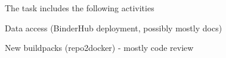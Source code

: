 \begin{task}[
  title=Support more use patterns,
  id=patterns,
  lead=SRL,
  PM=1,
  wphases={0-36},
  partners={XXX}
]
  The task includes the following activities
  \begin{compactitem}
  \item Data access (BinderHub deployment, possibly mostly docs)
  \item New buildpacks (repo2docker) - mostly code review
  \end{compactitem}
\end{task}

